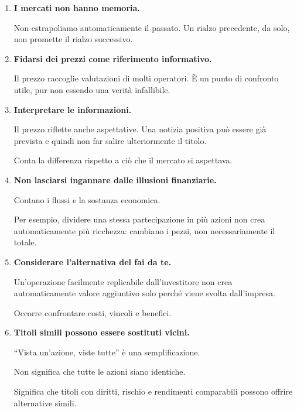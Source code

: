 \begin{enumerate}
    \item \textbf{I mercati non hanno memoria.}

    Non estrapoliamo automaticamente il passato.
    Un rialzo precedente, da solo,
    non promette il rialzo successivo.

    \item \textbf{Fidarsi dei prezzi
    come riferimento informativo.}

    Il prezzo raccoglie valutazioni
    di molti operatori.
    È un punto di confronto utile,
    pur non essendo una verità infallibile.

    \item \textbf{Interpretare le informazioni.}

    Il prezzo riflette anche aspettative.
    Una notizia positiva può essere già prevista
    e quindi non far salire ulteriormente il titolo.

    Conta la differenza rispetto a ciò
    che il mercato si aspettava.

    \item \textbf{Non lasciarsi ingannare
    dalle illusioni finanziarie.}

    Contano i flussi e la sostanza economica.

    Per esempio, dividere una stessa partecipazione
    in più azioni non crea automaticamente
    più ricchezza:
    cambiano i pezzi,
    non necessariamente il totale.

    \item \textbf{Considerare l'alternativa
    del fai da te.}

    Un'operazione facilmente replicabile
    dall'investitore non crea automaticamente
    valore aggiuntivo solo perché viene svolta
    dall'impresa.

    Occorre confrontare costi,
    vincoli e benefici.

    \item \textbf{Titoli simili possono essere
    sostituti vicini.}

    ``Vista un'azione, viste tutte''
    è una semplificazione.

    Non significa che tutte le azioni
    siano identiche.

    Significa che titoli con diritti,
    rischio e rendimenti comparabili
    possono offrire alternative simili.
\end{enumerate}

\medskip

